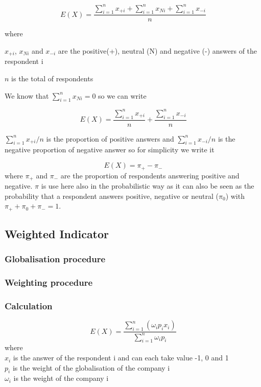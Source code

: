 \documentclass[12pt,a4paper,oneside]{book}
\begin{document}
\begin{equation}
    E(X) = \frac{ \sum_{i=1}^n x_{+i} + \sum_{i=1}^n x_{Ni} + \sum_{i=1}^n x_{-i}}{n}
\end{equation} 

where 

$x_{+i}$, $x_{Ni}$ and $x_{-i}$ are the positive(+), neutral (N) and negative (-) answers of the respondent i

$n$ is the total of respondents

We know that $\sum_{i=1}^n x_{Ni} = 0$ so we can write

\begin{equation}
    E(X) = \frac{\sum_{i=1}^n x_{+i}}{n}  + \frac{\sum_{i=1}^n x_{-i}}{n}
\end{equation} 

${\sum_{i=1}^n x_{+i}}/{n}$ is the proportion of positive answers and ${\sum_{i=1}^n x_{-i}}/{n}$ is the negative proportion of negative answer so for simplicity we write it 

\begin{equation}
    E(X) = \pi_+ - \pi_-
\end{equation}
where $\pi_+$ and $\pi_-$ are the proportion of respondents answering positive and negative. $\pi$ is use here also in the probabilistic way as it can also be seen as the probability that a respondent answers positive, negative or neutral ($\pi_0$) with $\pi_+ + \pi_0 + \pi_- =1$.


\newpage

\subsection{Weighted Indicator}

\subsubsection{Globalisation procedure}

\subsubsection{Weighting procedure}

\subsubsection{Calculation}

\begin{equation}
    E(X) = \frac{ \sum_{i=1}^n \left(\omega_i p_i x_i \right)}{\sum_{i=1}^n \omega_i p_i}
\end{equation} 
where \\
$x_i$ is the answer of the respondent i and can each take value -1, 0 and 1 \\
$p_i$ is the weight of the globalisation of the company i \\
$\omega_i$ is the weight of the company i
\end{document}
